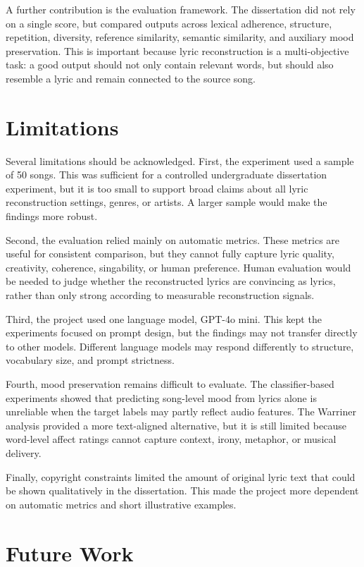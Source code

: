 A further contribution is the evaluation framework. The dissertation did not rely on a single score, but compared outputs across lexical adherence, structure, repetition, diversity, reference similarity, semantic similarity, and auxiliary mood preservation. This is important because lyric reconstruction is a multi-objective task: a good output should not only contain relevant words, but should also resemble a lyric and remain connected to the source song.

\section{Limitations}

Several limitations should be acknowledged. First, the experiment used a sample of 50 songs. This was sufficient for a controlled undergraduate dissertation experiment, but it is too small to support broad claims about all lyric reconstruction settings, genres, or artists. A larger sample would make the findings more robust.

Second, the evaluation relied mainly on automatic metrics. These metrics are useful for consistent comparison, but they cannot fully capture lyric quality, creativity, coherence, singability, or human preference. Human evaluation would be needed to judge whether the reconstructed lyrics are convincing as lyrics, rather than only strong according to measurable reconstruction signals.

Third, the project used one language model, GPT-4o mini. This kept the experiments focused on prompt design, but the findings may not transfer directly to other models. Different language models may respond differently to structure, vocabulary size, and prompt strictness.

Fourth, mood preservation remains difficult to evaluate. The classifier-based experiments showed that predicting song-level mood from lyrics alone is unreliable when the target labels may partly reflect audio features. The Warriner analysis provided a more text-aligned alternative, but it is still limited because word-level affect ratings cannot capture context, irony, metaphor, or musical delivery.

Finally, copyright constraints limited the amount of original lyric text that could be shown qualitatively in the dissertation. This made the project more dependent on automatic metrics and short illustrative examples.

\section{Future Work}

